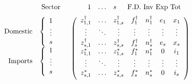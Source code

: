 \documentclass[a4paper]{article}
\begin{document}
\begin{equation}\label{eqn:T}
\begin{array}{rc}
\begin{array}{cc} & \mbox{Sector} \end{array} 
& 
\begin{array}{cccc} \hspace*{4mm}1 & \mathellipsis & s & \hspace*{2mm} \mbox{F.D. Inv Exp Tot} \end{array} \vspace*{2mm} \\
\begin{array}{r}
\begin{array}{rc}
\mbox{Domestic} & \left\{ \begin{array}{c}
1 \\
\vdots \\
s
\end{array} \right. \\
\mbox{Imports} & \left\{ \begin{array}{c}
1 \\
\vdots \\
s \\
\end{array} \right.
\end{array} \vspace*{2mm} \\
\end{array} &
\left( \begin{array}{ccccccc}
z^{\dag}_{1,1} & \mathellipsis & z^{\dag}_{1,s} & f^\dag_{1} & n^\dag_{1} & e_{1} & x_1 \\
\vdots & \ddots & \vdots & \vdots & \vdots & \vdots & \vdots \\
z^{\dag}_{s,1} & \mathellipsis & z^{\dag}_{s,s} & f^\dag_{s} & n^\dag_{s} & e_{s} & x_{s} \\
z^*_{1,1} & \mathellipsis & z^*_{1,s} & f^*_{1} & n^*_{1} & 0 & i_1 \\
\vdots & \ddots & \vdots & \vdots & \vdots & \vdots & \vdots \\
z^*_{s,1} & \mathellipsis & z^*_{s,s} & f^*_{s} & n^*_{s} & 0 & i_{s} \vspace*{2mm} \\
\end{array} \right)
\end{array}
\end{equation}
\end{document}
